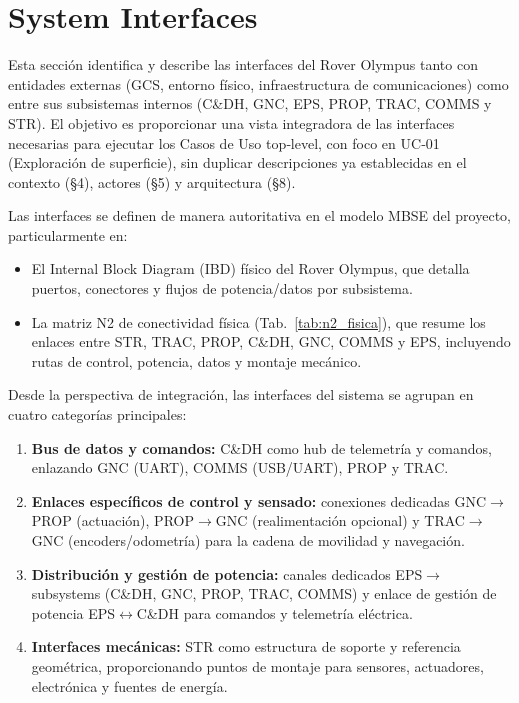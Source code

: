 
\section{System Interfaces}\label{sec:system_interfaces}

Esta sección identifica y describe las interfaces del Rover Olympus tanto con entidades externas (GCS, entorno físico, infraestructura de comunicaciones) como entre sus subsistemas internos (C\&DH, GNC, EPS, PROP, TRAC, COMMS y STR). El objetivo es proporcionar una vista integradora de las interfaces necesarias para ejecutar los Casos de Uso top‑level, con foco en UC‑01 (Exploración de superficie), sin duplicar descripciones ya establecidas en el contexto (§4), actores (§5) y arquitectura (§8).

Las interfaces se definen de manera autoritativa en el modelo MBSE del proyecto, particularmente en:
\begin{itemize}
    \item El Internal Block Diagram (IBD) físico del Rover Olympus, que detalla puertos, conectores y flujos de potencia/datos por subsistema.
    \item La matriz N2 de conectividad física (Tab.~\ref{tab:n2_fisica}), que resume los enlaces entre STR, TRAC, PROP, C\&DH, GNC, COMMS y EPS, incluyendo rutas de control, potencia, datos y montaje mecánico.
\end{itemize}

Desde la perspectiva de integración, las interfaces del sistema se agrupan en cuatro categorías principales:
\begin{enumerate}
    \item \textbf{Bus de datos y comandos:} C\&DH como hub de telemetría y comandos, enlazando GNC (UART), COMMS (USB/UART), PROP y TRAC.
    \item \textbf{Enlaces específicos de control y sensado:} conexiones dedicadas GNC$\rightarrow$PROP (actuación), PROP$\rightarrow$GNC (realimentación opcional) y TRAC$\rightarrow$GNC (encoders/odometría) para la cadena de movilidad y navegación.
    \item \textbf{Distribución y gestión de potencia:} canales dedicados EPS$\rightarrow$subsystems (C\&DH, GNC, PROP, TRAC, COMMS) y enlace de gestión de potencia EPS$\leftrightarrow$C\&DH para comandos y telemetría eléctrica.
    \item \textbf{Interfaces mecánicas:} STR como estructura de soporte y referencia geométrica, proporcionando puntos de montaje para sensores, actuadores, electrónica y fuentes de energía.
\end{enumerate}

